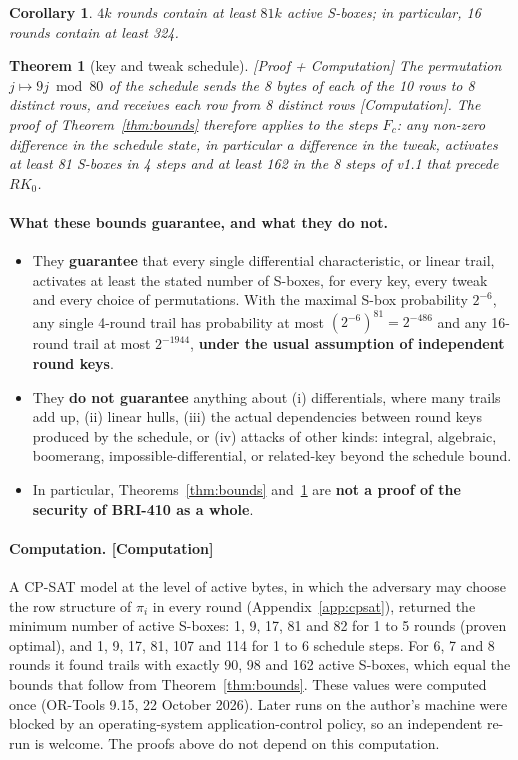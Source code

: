 \documentclass[11pt,a4paper]{article}
\newtheorem{theorem}{Theorem}
\newtheorem*{corollary}{Corollary}
\newcommand{\ev}[1]{\textup{\textsf{[#1]}}}
\newcommand{\RK}{\mathit{RK}}
\begin{document}
\begin{corollary}
$4k$ rounds contain at least $81k$ active S-boxes; in particular, 16 rounds contain at least 324.
\end{corollary}

\begin{theorem}[key and tweak schedule]\label{thm:schedule}
\ev{Proof + Computation} The permutation $j \mapsto 9j \bmod 80$ of the schedule sends the 8 bytes of each of the
10 rows to 8 distinct rows, and receives each row from 8 distinct rows \ev{Computation}. The proof of
Theorem~\ref{thm:bounds} therefore applies to the steps $F_c$: any non-zero difference in the schedule state, in
particular a difference in the tweak, activates at least 81 S-boxes in 4 steps and at least 162 in the 8 steps of
v1.1 that precede $\RK_0$.
\end{theorem}

\paragraph{What these bounds guarantee, and what they do not.}
\begin{itemize}
\item They \textbf{guarantee} that every single differential characteristic, or linear trail, activates at least
  the stated number of S-boxes, for every key, every tweak and every choice of permutations. With the maximal
  S-box probability $2^{-6}$, any single 4-round trail has probability at most $(2^{-6})^{81} = 2^{-486}$ and any
  16-round trail at most $2^{-1944}$, \textbf{under the usual assumption of independent round keys}.
\item They \textbf{do not guarantee} anything about (i) differentials, where many trails add up, (ii) linear
  hulls, (iii) the actual dependencies between round keys produced by the schedule, or (iv) attacks of other
  kinds: integral, algebraic, boomerang, impossible-differential, or related-key beyond the schedule bound.
\item In particular, Theorems~\ref{thm:bounds} and~\ref{thm:schedule} are \textbf{not a proof of the security of
  BRI-410 as a whole}.
\end{itemize}

\paragraph{Computation. \ev{Computation}} A CP-SAT model at the level of active bytes, in which the adversary may
choose the row structure of $\pi_i$ in every round (Appendix~\ref{app:cpsat}), returned the minimum number of
active S-boxes: 1, 9, 17, 81 and 82 for 1 to 5 rounds (proven optimal), and 1, 9, 17, 81, 107 and 114 for 1 to 6
schedule steps. For 6, 7 and 8 rounds it found trails with exactly 90, 98 and 162 active S-boxes, which equal
the bounds that follow from Theorem~\ref{thm:bounds}. These values were computed once (OR-Tools 9.15,
22 October 2026). Later runs on the author's machine were blocked by an operating-system application-control
policy, so an independent re-run is welcome. The proofs above do not depend on this computation.
\end{document}
